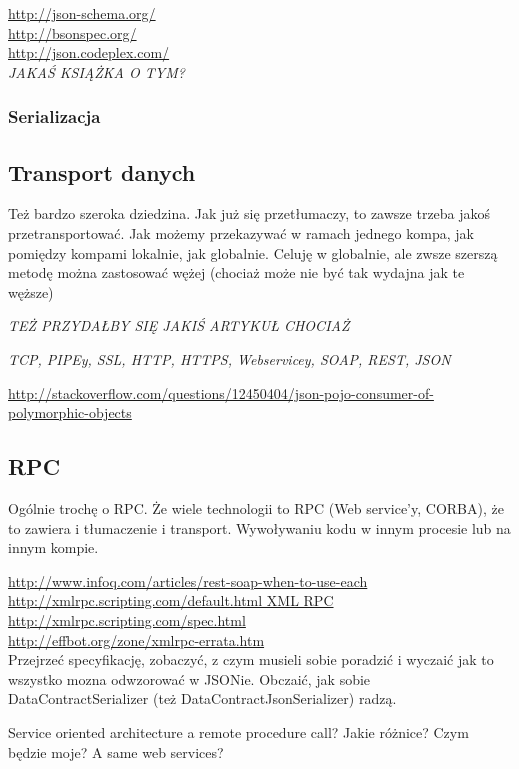 \url{http://json-schema.org/}\\
\url{http://bsonspec.org/}\\
\url{http://json.codeplex.com/}\\

\emph{JAKAŚ KSIĄŻKA O TYM?}

\subsubsection{Serializacja}

\subsection{Transport danych}
Też bardzo szeroka dziedzina. Jak już się przetłumaczy, to zawsze trzeba jakoś przetransportować. Jak możemy przekazywać w ramach jednego kompa, jak pomiędzy kompami lokalnie, jak globalnie.
Celuję w globalnie, ale zwsze szerszą metodę można zastosować wężej (chociaż może nie być tak wydajna jak te węższe)

\emph{TEŻ PRZYDAŁBY SIĘ JAKIŚ ARTYKUŁ CHOCIAŻ}

\emph{TCP, PIPEy, SSL, HTTP, HTTPS, Webservicey, SOAP, REST, JSON}

\url{http://stackoverflow.com/questions/12450404/json-pojo-consumer-of-polymorphic-objects}

\subsection{RPC}
Ogólnie trochę o RPC. Że wiele technologii to RPC (Web service'y, CORBA), że to zawiera i tłumaczenie i transport.
Wywoływaniu kodu w innym procesie lub na innym kompie.

\url{http://www.infoq.com/articles/rest-soap-when-to-use-each}\\

\url{http://xmlrpc.scripting.com/default.html XML RPC}\\
\url{http://xmlrpc.scripting.com/spec.html}\\
\url{http://effbot.org/zone/xmlrpc-errata.htm}\\
Przejrzeć specyfikację, zobaczyć, z czym musieli sobie poradzić i wyczaić jak to wszystko mozna odwzorować w JSONie. Obczaić, jak sobie DataContractSerializer (też DataContractJsonSerializer) radzą. 

Service oriented architecture a remote procedure call? Jakie różnice? Czym będzie moje? A same web services?

